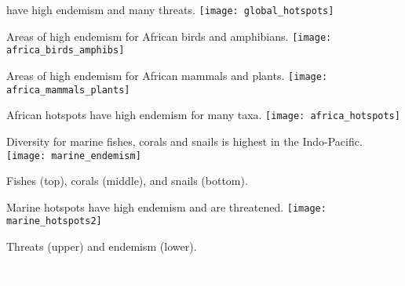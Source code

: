 \documentclass[t]{beamer}
\begin{document}
\begin{frame}[plain]{ have high endemism and many threats.}
	\centering%
		\texttt{[image: global\_hotspots]}\\
\end{frame}

\begin{frame}[plain]{Areas of high endemism for African birds and amphibians.}
	\centering%
		\texttt{[image: africa\_birds\_amphibs]}\\
\end{frame}

\begin{frame}[plain]{Areas of high endemism for African mammals and plants.}
	\centering%
		\texttt{[image: africa\_mammals\_plants]}\\
\end{frame}

\begin{frame}[plain]{African hotspots have high endemism for many taxa.}
	\centering
		\texttt{[image: africa\_hotspots]}\\
\end{frame}

\begin{frame}[plain]{Diversity for marine fishes, corals and snails is highest in the Indo-Pacific.}
	\centering
		\texttt{[image: marine\_endemism]}
		
	Fishes (top), corals (middle), and snails (bottom).
\end{frame}

\begin{frame}[plain]{Marine hotspots have high endemism and are threatened.}
	\centering
		\texttt{[image: marine\_hotspots2]}

	Threats (upper) and endemism (lower).
		
\end{frame}

{
\begin{frame}[plain]

\vfilll

\hfill \tiny \textcolor{white}{\copyright\,Klaus Nigge, National Geographic}
\end{frame}
}
\end{document}

